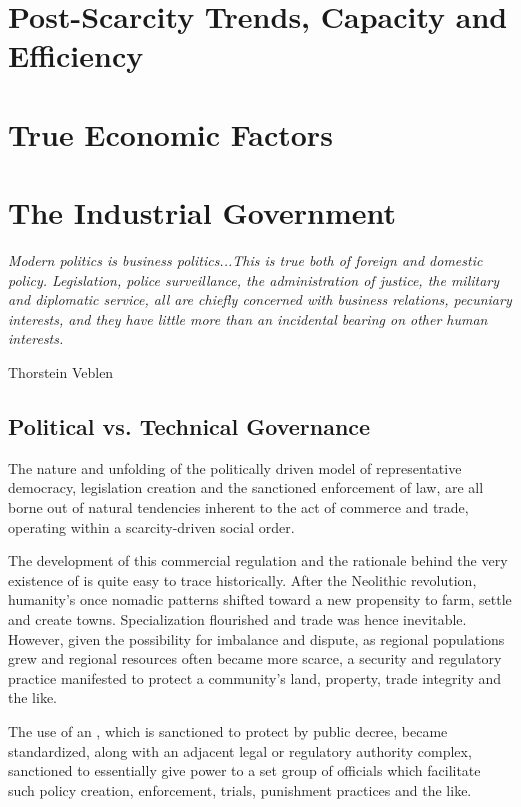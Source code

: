 \documentclass[10pt, a4paper, cleardoubleempty, openright, twoside]{book}
\begin{document}
\chapter {Post-Scarcity Trends, Capacity and Efficiency}

\chapter {True Economic Factors}
\chapter {The Industrial Government}
\epigraph{\itshape
Modern politics is business politics...This is true both of foreign and
domestic policy. Legislation, police surveillance, the administration of
justice, the military and diplomatic service, all are chiefly concerned
with business relations, pecuniary interests, and they have little more
than an incidental bearing on other human interests.}{Thorstein
Veblen~\cite[p.~269]{Veblen::78}}

\section {Political vs. Technical Governance}

The nature and unfolding of the politically driven model of
representative democracy, legislation creation and the sanctioned
enforcement of law, are all borne out of natural tendencies inherent to
the act of commerce and trade, operating within a scarcity-driven social
order. 


The development of this commercial regulation and the rationale behind
the very existence of  is quite easy to
trace historically. After the Neolithic revolution, humanity's once
nomadic patterns shifted toward a new propensity to farm, settle and
create towns. Specialization flourished and trade was hence inevitable.
However, given the possibility for imbalance and dispute, as regional
populations grew and regional resources often became more scarce, a
security and regulatory practice manifested to protect a community's
land, property, trade integrity and the like. 


The use of an , which is sanctioned to protect by public
decree, became standardized, along with an adjacent legal or regulatory
authority complex, sanctioned to essentially give power to a set group
of officials which facilitate such policy creation, enforcement, trials,
punishment practices and the like. 
\end{document}
